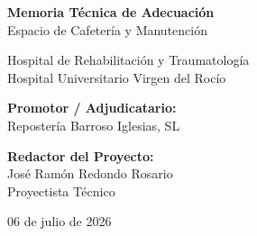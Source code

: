 \begin{titlepage}
    \centering
    \vspace*{2cm}
    
    {\Huge\bfseries Memoria Técnica de Adecuación\\[0.5cm]}
    {\Large Espacio de Cafetería y Manutención\\[1.5cm]}
    
    {\large Hospital de Rehabilitación y Traumatología\\[0.3cm]}
    {\large Hospital Universitario Virgen del Rocío\\[3cm]}
    
    \begin{minipage}{0.8\linewidth}
        \centering
        \textbf{Promotor / Adjudicatario:}\\[0.2cm]
        {\large Repostería Barroso Iglesias, SL\\[2.5cm]}
        
        \textbf{Redactor del Proyecto:}\\[0.2cm]
        {\large José Ramón Redondo Rosario\\[0.2cm]}
        {\small Proyectista Técnico}
    \end{minipage}
    
    \vfill
    
    {\large 06 de julio de 2026}
\end{titlepage}
